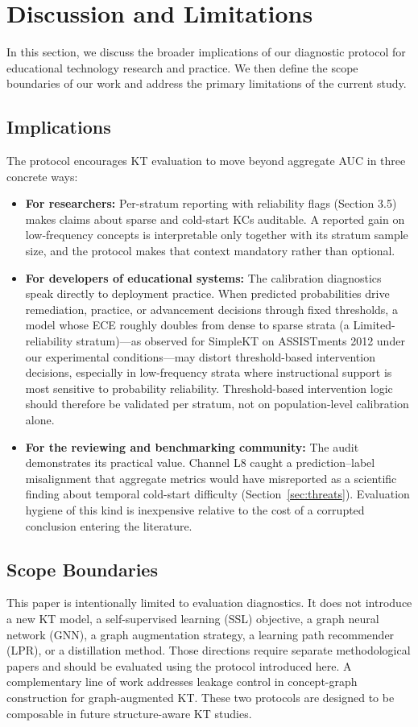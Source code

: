 \section{Discussion and Limitations}
\label{sec:discussion}
In this section, we discuss the broader implications of our diagnostic protocol for educational technology research and practice. We then define the scope boundaries of our work and address the primary limitations of the current study.

\subsection{Implications}
The protocol encourages KT evaluation to move beyond aggregate AUC in three concrete ways:
\begin{itemize}
    \item \textbf{For researchers:} Per-stratum reporting with reliability flags (Section 3.5) makes claims about sparse and cold-start KCs auditable. A reported gain on low-frequency concepts is interpretable only together with its stratum sample size, and the protocol makes that context mandatory rather than optional.
    \item \textbf{For developers of educational systems:} The calibration diagnostics speak directly to deployment practice. When predicted probabilities drive remediation, practice, or advancement decisions through fixed thresholds, a model whose ECE roughly doubles from dense to sparse strata (a Limited-reliability stratum)---as observed for SimpleKT on ASSISTments 2012 under our experimental conditions---may distort threshold-based intervention decisions, especially in low-frequency strata where instructional support is most sensitive to probability reliability. Threshold-based intervention logic should therefore be validated per stratum, not on population-level calibration alone.
    \item \textbf{For the reviewing and benchmarking community:} The audit demonstrates its practical value. Channel L8 caught a prediction--label misalignment that aggregate metrics would have misreported as a scientific finding about temporal cold-start difficulty (Section~\ref{sec:threats}). Evaluation hygiene of this kind is inexpensive relative to the cost of a corrupted conclusion entering the literature.
\end{itemize}

\subsection{Scope Boundaries}
This paper is intentionally limited to evaluation diagnostics. It does not introduce a new KT model, a self-supervised learning (SSL) objective, a graph neural network (GNN), a graph augmentation strategy, a learning path recommender (LPR), or a distillation method. Those directions require separate methodological papers and should be evaluated using the protocol introduced here. A complementary line of work addresses leakage control in concept-graph construction for graph-augmented KT. These two protocols are designed to be composable in future structure-aware KT studies.

